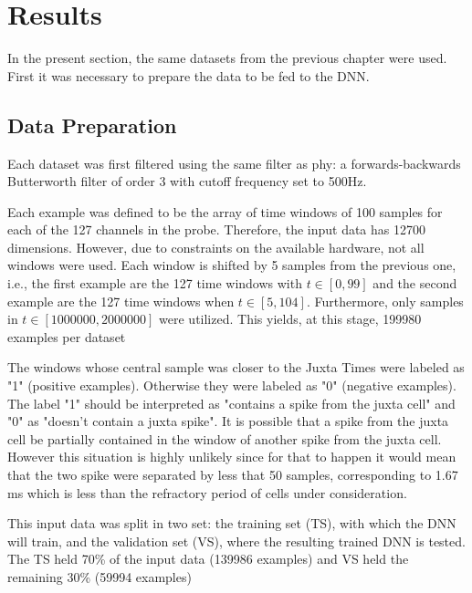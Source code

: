 \documentclass{article}
\begin{document}
\section{Results}
\label{sec:DL-results}


In the present section, the same datasets from the previous chapter were used. 
First it was necessary to prepare the data to be fed to the DNN.
\subsection{Data Preparation}
Each dataset was first filtered using the same filter as phy: a forwards-backwards Butterworth filter of order 3 with cutoff frequency set to 500Hz.

Each example was defined to be the array of time windows of 100 samples for each of the 127 channels in the probe. Therefore, the input data has 12700 dimensions. However, due to constraints on the available hardware, not all windows were used. Each window is shifted by 5 samples from the previous one, i.e., the first example are the 127 time windows with $t \in [ 0 , 99]$ and the second example are the 127 time windows when $t \in [ 5, 104]$. Furthermore, only samples in $t \in [1000000,2000000]$ were utilized. This yields, at this stage, 199980 examples per dataset

The windows whose central sample was closer to the Juxta Times were labeled as "1" (positive examples). Otherwise they were labeled as "0" (negative examples). The label "1" should be interpreted as "contains a spike from the juxta cell" and "0" as "doesn't contain a juxta spike". It is possible that a spike from the juxta cell be partially contained in the window of another spike from the juxta cell. However this situation is highly unlikely since for that to happen it would mean that the two spike were separated by less that 50 samples, corresponding to 1.67 ms which is less than the refractory period of cells under consideration.

This input data was split in two set: the training set (TS), with which the DNN will train, and the validation set (VS), where the resulting trained DNN is tested. The TS held 70\% of the input data (139986 examples) and VS held the remaining 30\% (59994 examples)
\end{document}

